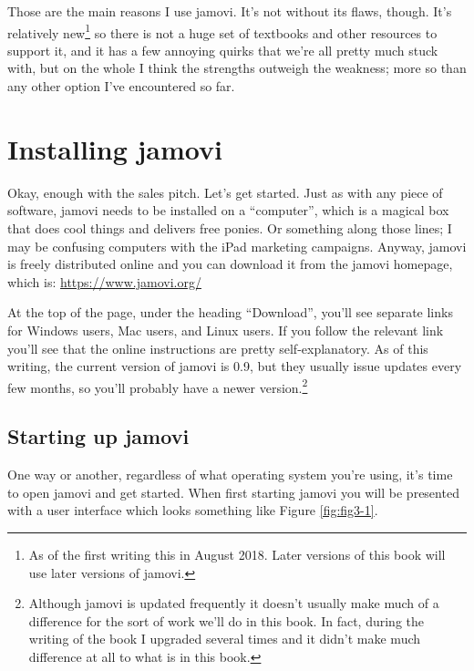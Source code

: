 \documentclass[
]{book}
\begin{document}
Those are the main reasons I use jamovi. It's not without its flaws, though. It's relatively new\footnote{As of the first writing this in August 2018. Later versions of this book will use later versions of jamovi.} so there is not a huge set of textbooks and other resources to support it, and it has a few annoying quirks that we're all pretty much stuck with, but on the whole I think the strengths outweigh the weakness; more so than any other option I've encountered so far.

\hypertarget{installing-jamovi}{%
\section{Installing jamovi}\label{installing-jamovi}}

Okay, enough with the sales pitch. Let's get started. Just as with any piece of software, jamovi needs to be installed on a ``computer'', which is a magical box that does cool things and delivers free ponies. Or something along those lines; I may be confusing computers with the iPad marketing campaigns. Anyway, jamovi is freely distributed online and you can download it from the jamovi homepage, which is: \url{https://www.jamovi.org/}

At the top of the page, under the heading ``Download'', you'll see separate links for Windows users, Mac users, and Linux users. If you follow the relevant link you'll see that the online instructions are pretty self-explanatory. As of this writing, the current version of jamovi is 0.9, but they usually issue updates every few months, so you'll probably have a newer version.\footnote{Although jamovi is updated frequently it doesn't usually make much of a difference for the sort of work we'll do in this book. In fact, during the writing of the book I upgraded several times and it didn't make much difference at all to what is in this book.}

\hypertarget{starting-up-jamovi}{%
\subsection{Starting up jamovi}\label{starting-up-jamovi}}

One way or another, regardless of what operating system you're using, it's time to open jamovi and get started. When first starting jamovi you will be presented with a user interface which looks something like Figure \ref{fig:fig3-1}.
\end{document}
